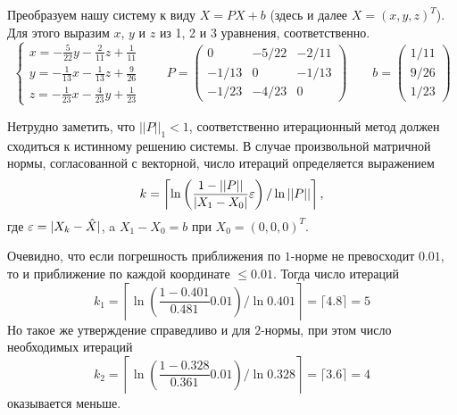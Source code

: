 Преобразуем нашу систему к виду $X = PX + b$ (здесь и далее $X = (x, y, z)^T$).
Для этого выразим $x$, $y$ и $z$ из 1, 2 и 3 уравнения, соответственно.
\begin{equation*}
    \begin{cases}
        x = -\frac{5}{22}y - \frac{2}{11}z + \frac{1}{11}\\
        y = -\frac{1}{13}x - \frac{1}{13}z + \frac{9}{26}\\
        z = -\frac{1}{23}x - \frac{4}{23}y + \frac{1}{23}
    \end{cases}
    \qquad
    P = \begin{pmatrix}
        0 & -{5/22} & -{2/11}\\
        -{1/13} & 0 & -{1/13}\\
        -{1/23} & -{4/23} & 0
    \end{pmatrix}
    \qquad
    b = \begin{pmatrix}
        {1/11}\\
        {9/26}\\
        {1/23}
    \end{pmatrix}
\end{equation*}

Нетрудно заметить, что $||P||_1 < 1$, соответственно итерационный метод должен
сходиться к истинному решению системы. В случае произвольной матричной нормы,
согласованной с векторной, число итераций определяется выражением
\begin{equation*}
    k =  \left \lceil \ln \left(\frac{1 - ||P||}{|X_1 - X_0|} \varepsilon\right)
                      / \ln{||P||} \right \rceil,
\end{equation*}
где $\varepsilon = |X_k - \hat{X}|$, a $X_1 - X_0 = b$ при $X_0 = (0, 0, 0)^T$.

Очевидно, что если погрешность приближения по $1$-норме не превосходит $0.01$,
то и приближение по каждой координате $\leq 0.01$. Тогда число итераций
\begin{equation*}
    k_1 =  \left\lceil \ln \left(\frac{1 - 0.401}{0.481} 0.01\right)
                       / \ln{0.401} \right \rceil
        = \lceil 4.8 \rceil = 5
\end{equation*}
Но такое же утверждение справедливо и для $2$-нормы, при этом число необходимых
итераций
\begin{equation*}
    k_2 =  \left\lceil \ln \left(\frac{1 - 0.328}{0.361} 0.01\right)
                       / \ln{0.328} \right \rceil
        = \lceil 3.6 \rceil = 4
\end{equation*}
оказывается меньше.

